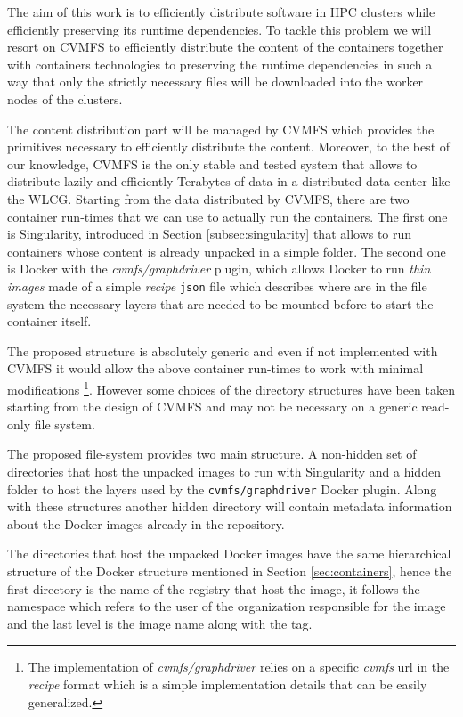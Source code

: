 The aim of this work is to efficiently distribute software in HPC clusters
while efficiently preserving its runtime dependencies. To tackle this problem
we will resort on CVMFS to efficiently distribute the content of the containers
together with containers technologies to preserving the runtime dependencies in
such a way that only the strictly necessary files will be downloaded into the
worker nodes of the clusters.


The content distribution part will be managed by CVMFS which provides
the primitives necessary to efficiently distribute the content. Moreover, to
the best of our knowledge, CVMFS is the only stable and tested system that
allows to distribute lazily and efficiently Terabytes of data in a distributed
data center like the WLCG.  Starting from the data distributed by CVMFS, there
are two container run-times that we can use to actually run the containers.
The first one is Singularity, introduced in Section \ref{subsec:singularity}
that allows to run containers whose content is already unpacked in a simple
folder. The second one is Docker with the \textit{cvmfs/graphdriver} plugin,
which allows Docker to run \textit{thin images} made of a simple
\textit{recipe} \texttt{json} file which describes where are in the file system
the necessary layers that are needed to be mounted before to start the
container itself.

The proposed structure is absolutely generic and even if not implemented with
CVMFS it would allow the above container run-times to work with minimal
modifications \footnote{The implementation of \textit{cvmfs/graphdriver} relies
on a specific \textit{cvmfs} url in the \textit{recipe} format which is a
simple implementation details that can be easily generalized.}. However some
choices of the directory structures have been taken starting from the design of
CVMFS and may not be necessary on a generic read-only file system.

The proposed file-system provides two main structure. A non-hidden set of
directories that host the unpacked images to run with Singularity and a hidden
folder to host the layers used by the \texttt{cvmfs/graphdriver} Docker plugin.
Along with these structures another hidden directory will contain metadata
information about the Docker images already in the repository.

The directories that host the unpacked Docker images have the same hierarchical
structure of the Docker structure mentioned in Section \ref{sec:containers}, hence
the first directory is the name of the registry that host the image, it follows
the namespace which refers to the user of the organization responsible for the
image and the last level is the image name along with the tag.


